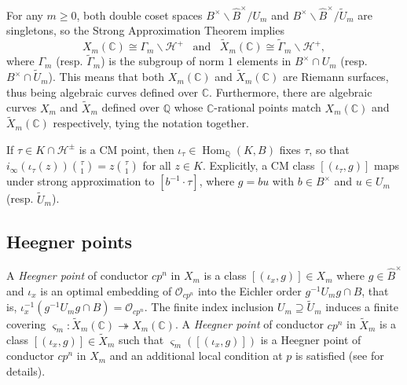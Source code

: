 \documentclass[a4paper]{amsart}
\numberwithin{equation}{section}
\theoremstyle{definition}
\newcommand{\Q}{\mathbb{Q}}
\newcommand{\C}{\mathbb{C}}
\DeclareMathOperator{\Hom}{Hom}
\begin{document}
For any $m\ge 0$, both double coset spaces $B^\times\backslash\widehat{B}^\times/U_m$ and $B^\times\backslash\widehat{B}^\times/\widetilde{U}_m$ are singletons, so the Strong Approximation Theorem implies
\begin{equation}\label{eq.RiemannSurfaces}
X_m(\C)\cong\Gamma_m\backslash\mathcal{H}^{+}\hspace{10pt}\text{and}\hspace{10pt}\widetilde{X}_m(\C)\cong\widetilde{\Gamma}_m\backslash\mathcal{H}^{+},
\end{equation}
where $\Gamma_m$ (resp. $\widetilde\Gamma_m$) is the subgroup of norm $1$ elements in $B^\times\cap U_m$ (resp. $B^\times\cap\widetilde U_m$). This means that both $X_m(\C)$ and $\widetilde{X}_m(\C)$ are Riemann surfaces, thus being algebraic curves defined over $\C$. Furthermore, there are algebraic curves $X_m$ and $\widetilde{X}_m$ defined over $\Q$ whose $\C$-rational points match $X_m(\C)$ and $\widetilde{X}_m(\C)$ respectively, tying the notation together.

If $\tau\in K\cap\mathcal{H}^{\pm}$ is a CM point, then $\iota_\tau\in\Hom_{\Q}(K,B)$ fixes $\tau$, so that $i_\infty(\iota_\tau(z))\binom{\tau}{1}=z\binom{\tau}{1}$ for all $z\in K$. Explicitly, a CM class $[(\iota_\tau,g)]$ maps under strong approximation to $[b^{-1}\cdot\tau]$, where $g=bu$ with $b\in B^\times$ and $u\in U_m$ (resp. $\widetilde{U}_m$).

\subsection{Heegner points}\label{subsec.HeegnerPoints}
A \textit{Heegner point} of conductor $cp^n$ in $X_m$ is a class $[(\iota_x,g)]\in X_m$ where $g\in\widehat{B}^\times$ and $\iota_x$ is an optimal embedding of $\mathcal{O}_{cp^n}$ into the Eichler order $g^{-1}U_mg\cap B$, that is, $\iota_x^{-1}(g^{-1}U_mg\cap B)=\mathcal{O}_{cp^n}$. The finite index inclusion $U_m\supseteq\widetilde{U}_m$ induces a finite covering $\varsigma_m\colon\widetilde{X}_m(\C)\twoheadrightarrow X_m(\C)$. A \textit{Heegner point} of conductor $cp^n$ in $\widetilde{X}_m$ is a class $[(\iota_x,g)]\in\widetilde{X}_m$ such that $\varsigma_m([(\iota_x,g)])$ is a Heegner point of conductor $cp^n$ in $X_m$ and an additional local condition at $p$ is satisfied (see \cite[\S3]{LongoVigni.Manuscripta} for details).
\end{document}
